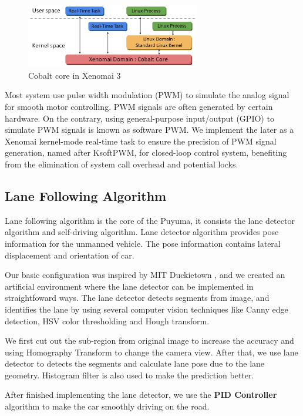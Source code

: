 \documentclass[conference]{IEEEtran}
\begin{document}
\FloatBarrier
\begin{figure}
	\centering
	\includegraphics[width=3in]{img/xeno_arch.jpg}
	\caption{Cobalt core in Xenomai 3}
	\label{fig:xeno_arch}
\end{figure}

Most system use pulse width modulation (PWM) to simulate the analog signal for smooth motor controlling. PWM signals are often generated by certain hardware. On the contrary, using general-purpose input/output (GPIO) to simulate PWM signals is known as software PWM. We implement the later as a Xenomai kernel-mode real-time task to ensure the precision of PWM signal generation, named after KsoftPWM, for closed-loop control system, benefiting from the elimination of system call overhead and potential locks.

\subsection{Lane Following Algorithm}

Lane following algorithm is the core of the Puyuma, it consists the lane detector algorithm and self-driving algorithm. Lane detector algorithm provides pose information for the unmanned vehicle. The pose information contains lateral displacement and orientation of car.

Our basic configuration was inspired by MIT Duckietown \cite{Duckietown}, and we created an artificial environment where the lane detector can be implemented in straightfoward ways. The lane detector detects segments from image, and identifies the lane by using several computer vision techniques like Canny edge detection, HSV color thresholding and Hough transform.

We first cut out the sub-region from original image to increase the accuracy and using Homography Transform to change the camera view. After that, we use lane detector to detects the segments and calculate lane pose due to the lane geometry. Histogram filter is also used to make the prediction better. 

After finished implementing the lane detector, we use the \textbf{PID Controller} algorithm to make the car smoothly driving on the road.
\end{document}

